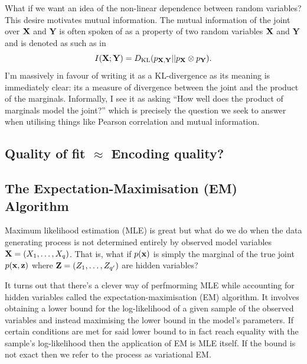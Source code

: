 \documentclass[11pt]{article}
\begin{document}
\begin{appendices}
What if we want an idea of the non-linear dependence between random variables? This desire motivates mutual information. The mutual information of the joint over $\mathbf{X}$ and $\mathbf{Y}$ is often spoken of as a property of two random variables $\mathbf{X}$ and $\mathbf{Y}$ and is denoted as such as in
$$
I(\mathbf{X};\mathbf{Y})
=
D_{\text{KL}}(p_{\mathbf{X},\mathbf{Y}}||p_{\mathbf{X}}\otimes p_{\mathbf{Y}}).
$$
I'm massively in favour of writing it as a KL-divergence as its meaning is immediately clear: its a measure of divergence between the joint and the product of the marginals. Informally, I see it as asking ``How well does the product of marginals model the joint?'' which is precisely the question we seek to answer when utilising things like Pearson correlation and mutual information.

\subsection{Quality of fit $\approx$ Encoding quality?}

\subsection{The Expectation-Maximisation (EM) Algorithm}
Maximum likelihood estimation (MLE) is great but what do we do when the data generating process is not determined entirely by observed model variables $\mathbf{X}=(X_1,\dots,X_q)$. That is, what if $p(\mathbf{x})$ is simply the marginal of the true joint $p(\mathbf{x},\mathbf{z})$ where $\mathbf{Z}=(Z_1,\dots,Z_{q'})$ are hidden variables?

It turns out that there's a clever way of perfmorming MLE while accounting for hidden variables called the expectation-maximisation (EM) algorithm. It involves obtaining a lower bound for the log-likelihood of a given sample of the observed variables and instead maximising the lower bound in the model's parameters. If certain conditions are met for said lower bound to in fact reach equality with the sample's log-likelihood then the application of EM is MLE itself. If the bound is not exact then we refer to the process as variational EM.


\end{appendices}
\end{document}

